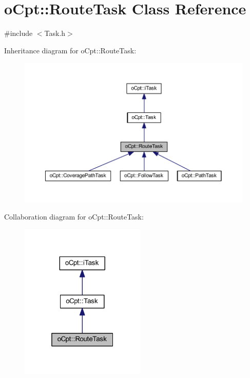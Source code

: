 \hypertarget{classo_cpt_1_1_route_task}{}\section{o\+Cpt\+:\+:Route\+Task Class Reference}
\label{classo_cpt_1_1_route_task}


{\ttfamily \#include $<$Task.\+h$>$}



Inheritance diagram for o\+Cpt\+:\+:Route\+Task\+:\nopagebreak
\begin{figure}[H]
\begin{center}
\leavevmode
\includegraphics[width=350pt]{classo_cpt_1_1_route_task__inherit__graph}
\end{center}
\end{figure}


Collaboration diagram for o\+Cpt\+:\+:Route\+Task\+:\nopagebreak
\begin{figure}[H]
\begin{center}
\leavevmode
\includegraphics[width=169pt]{classo_cpt_1_1_route_task__coll__graph}
\end{center}
\end{figure}
